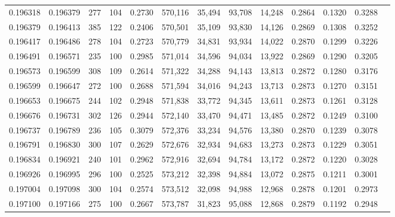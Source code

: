 \begin{tabular}{rrrrrrrrrrrrr}
0.196318 & 0.196379 &   277 & 104 &                                     0.2730 & 570,116 &  35,494 &  93,708 &  14,248 & 0.2864 & 0.1320 & 0.3288 \\
0.196379 & 0.196413 &   385 & 122 &                                     0.2406 & 570,501 &  35,109 &  93,830 &  14,126 & 0.2869 & 0.1308 & 0.3252 \\
0.196417 & 0.196486 &   278 & 104 &                                     0.2723 & 570,779 &  34,831 &  93,934 &  14,022 & 0.2870 & 0.1299 & 0.3226 \\
0.196491 & 0.196571 &   235 & 100 &                                     0.2985 & 571,014 &  34,596 &  94,034 &  13,922 & 0.2869 & 0.1290 & 0.3205 \\
0.196573 & 0.196599 &   308 & 109 &                                     0.2614 & 571,322 &  34,288 &  94,143 &  13,813 & 0.2872 & 0.1280 & 0.3176 \\
0.196599 & 0.196647 &   272 & 100 &                                     0.2688 & 571,594 &  34,016 &  94,243 &  13,713 & 0.2873 & 0.1270 & 0.3151 \\
0.196653 & 0.196675 &   244 & 102 &                                     0.2948 & 571,838 &  33,772 &  94,345 &  13,611 & 0.2873 & 0.1261 & 0.3128 \\
0.196676 & 0.196731 &   302 & 126 &                                     0.2944 & 572,140 &  33,470 &  94,471 &  13,485 & 0.2872 & 0.1249 & 0.3100 \\
0.196737 & 0.196789 &   236 & 105 &                                     0.3079 & 572,376 &  33,234 &  94,576 &  13,380 & 0.2870 & 0.1239 & 0.3078 \\
0.196791 & 0.196830 &   300 & 107 &                                     0.2629 & 572,676 &  32,934 &  94,683 &  13,273 & 0.2873 & 0.1229 & 0.3051 \\
0.196834 & 0.196921 &   240 & 101 &                                     0.2962 & 572,916 &  32,694 &  94,784 &  13,172 & 0.2872 & 0.1220 & 0.3028 \\
0.196926 & 0.196995 &   296 & 100 &                                     0.2525 & 573,212 &  32,398 &  94,884 &  13,072 & 0.2875 & 0.1211 & 0.3001 \\
0.197004 & 0.197098 &   300 & 104 &                                     0.2574 & 573,512 &  32,098 &  94,988 &  12,968 & 0.2878 & 0.1201 & 0.2973 \\
0.197100 & 0.197166 &   275 & 100 &                                     0.2667 & 573,787 &  31,823 &  95,088 &  12,868 & 0.2879 & 0.1192 & 0.2948 \\

\end{tabular}
